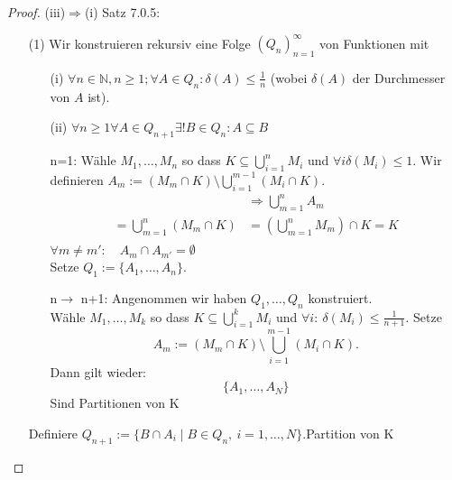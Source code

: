 
\begin{proof}{(iii)$\Rightarrow$(i) Satz 7.0.5:}\\
\begin{itemize}
    \item[(1)] Wir konstruieren rekursiv eine Folge $(Q_n)^{\infty}_{n=1}$ von Funktionen
    mit 
    \begin{itemize}
        \item[(i)]$\forall n \in \mathbb{N}, n\geq 1; \forall A \in Q_n: \delta(A) \leq \frac{1}{n}$ 
        (wobei $\delta(A)$ der Durchmesser von $A$ ist).
        \item[(ii)] $\forall n \geq 1 \forall A \in Q_{n+1} \exists !B \in Q_n: A \subseteq B$
    \end{itemize}
    \begin{itemize}
        \item[n=1:] Wähle $M_1,\dots,M_n$ so dass
        $K \subseteq \bigcup_{i = 1}^{n} M_i$ und $\forall i \delta(M_i) \leq 1$.
        Wir definieren $A_m := (M_m \cap K) \setminus \bigcup_{i=1}^{m-1} (M_i \cap K)$.
        \begin{equation*}
        \begin{split}
            &\Rightarrow \bigcup_{m=1}^{n} A_m \\
            = \bigcup_{m=1}^{n} (M_m \cap K) 
            &= \left( \bigcup_{m=1}^{n} M_m \right) \cap K = K\\
        \end{split}
        \end{equation*}
        $\forall m \neq m' : \quad A_m \cap A_{m'} = \emptyset$\\
        Setze $Q_1 := \{A_1,\dots,A_n\}$.
        \item[n$\to$ n+1:] Angenommen wir haben $Q_1,\dots,Q_n$ konstruiert.\\
        Wähle $M_1,\dots,M_k$ so dass
        $K \subseteq \bigcup_{i = 1}^{k} M_i$ und 
        \(\forall i:\ \delta(M_i) \le \frac{1}{n+1}.\)
        Setze $$A_m := (M_m \cap K) \setminus \bigcup_{i=1}^{m-1} (M_i \cap K).$$
        Dann gilt wieder:
        $$
        \{A_1,\dots,A_N\}
        $$
        Sind Partitionen von K
    \end{itemize}
    Definiere $Q_{n+1} := \{ B \cap A_i \mid B \in Q_n,\ i = 1, \ldots, N \}$.Partition von K
\end{itemize}
\end{proof}
